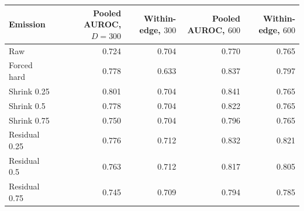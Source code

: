 \begin{tabular}{lrrrr}
\toprule
Emission & Pooled AUROC, $D=300$ & Within-edge, $300$ & Pooled AUROC, $600$ & Within-edge, $600$ \\
\midrule
Raw & 0.724 & 0.704 & 0.770 & 0.765 \\
Forced hard & 0.778 & 0.633 & 0.837 & 0.797 \\
Shrink 0.25 & 0.801 & 0.704 & 0.841 & 0.765 \\
Shrink 0.5 & 0.778 & 0.704 & 0.822 & 0.765 \\
Shrink 0.75 & 0.750 & 0.704 & 0.796 & 0.765 \\
Residual 0.25 & 0.776 & 0.712 & 0.832 & 0.821 \\
Residual 0.5 & 0.763 & 0.712 & 0.817 & 0.805 \\
Residual 0.75 & 0.745 & 0.709 & 0.794 & 0.785 \\
\bottomrule
\end{tabular}
